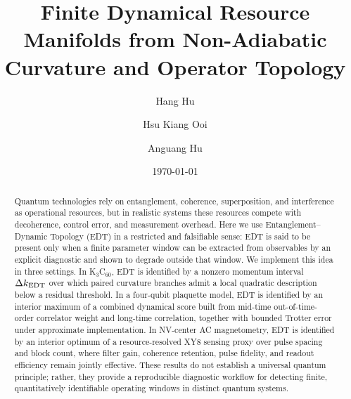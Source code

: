 \documentclass[
  prx,
  reprint,
  superscriptaddress,
  amsmath,
  amssymb,
  aps
]{revtex4-2}
\begin{document}
\title{Finite Dynamical Resource Manifolds from Non-Adiabatic Curvature and Operator Topology}

\author{Hang Hu}

\author{Hsu Kiang Ooi}

\author{Anguang Hu}

\date{\today}

\begin{abstract}
Quantum technologies rely on entanglement, coherence, superposition, and interference as operational resources, but in realistic systems these resources compete with decoherence, control error, and measurement overhead. Here we use Entanglement--Dynamic Topology (EDT) in a restricted and falsifiable sense: EDT is said to be present only when a finite parameter window can be extracted from observables by an explicit diagnostic and shown to degrade outside that window. We implement this idea in three settings. In K$_3$C$_{60}$, EDT is identified by a nonzero momentum interval $\Delta k_{\rm EDT}$ over which paired curvature branches admit a local quadratic description below a residual threshold. In a four-qubit plaquette model, EDT is identified by an interior maximum of a combined dynamical score built from mid-time out-of-time-order correlator weight and long-time correlation, together with bounded Trotter error under approximate implementation. In NV-center AC magnetometry, EDT is identified by an interior optimum of a resource-resolved XY8 sensing proxy over pulse spacing and block count, where filter gain, coherence retention, pulse fidelity, and readout efficiency remain jointly effective. These results do not establish a universal quantum principle; rather, they provide a reproducible diagnostic workflow for detecting finite, quantitatively identifiable operating windows in distinct quantum systems.
\end{abstract}

\maketitle
\end{document}
